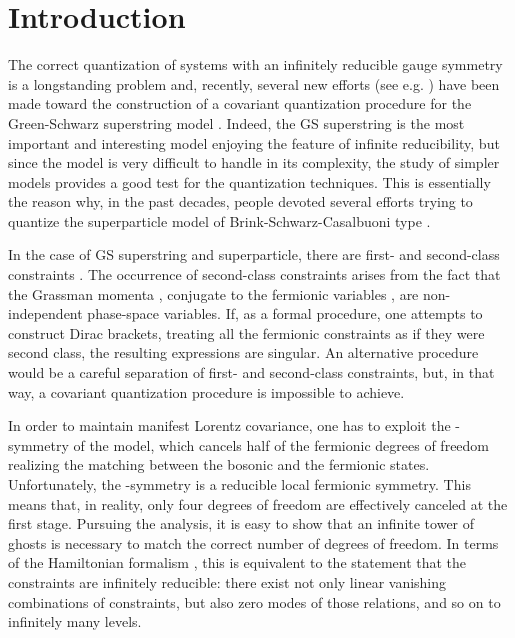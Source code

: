 \documentclass[a4paper,12pt]{article}
\renewcommand{\theequation}{\thesection.\arabic{equation}}
\begin{document}
\def\SL#1{\rlap{\hbox{\myHighlight{$\mskip 4.5 mu /$}\coordHE{}}}#1}     %
\renewcommand {\theequation}{\arabic{section}.\arabic{equation}}


\section{Introduction}
\label{sec:intro}


The correct quantization of systems with an infinitely reducible gauge
symmetry is a longstanding problem and, recently, several new efforts
(see e.g. \cite{berko}) have been made toward the construction of a
covariant quantization procedure for the Green-Schwarz superstring
model \cite{green3}. Indeed, the GS superstring is the most important
and interesting model enjoying the feature of infinite reducibility,
but since the model is very difficult to handle in its complexity, the
study of simpler models provides a good test for the quantization
techniques. This is essentially the reason why, in the past decades,
people devoted several efforts trying to quantize the superparticle
model of Brink-Schwarz-Casalbuoni type \cite{Brink-Schwarz}.

In the case of GS superstring and superparticle, there are first- and
second-class constraints \cite{Dirac,henneaux,gitman,bht}.  The occurrence
of second-class constraints arises from the fact that the Grassman
momenta \coordHE{}, conjugate to the fermionic variables
\myHighlight{$\theta_\alpha$}\coordHE{}, are non-independent phase-space variables.  If, as a
formal procedure, one attempts to construct Dirac brackets, treating
all the fermionic constraints as if they were second class, the
resulting expressions are singular. An alternative procedure would be
a careful separation of first- and second-class constraints, but, in
that way, a covariant quantization procedure is impossible to achieve.

In order to maintain manifest Lorentz covariance, one has to exploit
the \myHighlight{$\kappa$}\coordHE{}-symmetry \cite{green3,Siegel:1983hh} of the model, which
cancels half of the fermionic degrees of freedom realizing the
matching between the bosonic and the fermionic states.  Unfortunately,
the \myHighlight{$\kappa$}\coordHE{}-symmetry is a reducible local fermionic symmetry. This
means that, in reality, only four degrees of freedom are effectively
canceled at the first stage. Pursuing the analysis, it is easy to show
that an infinite tower of ghosts is necessary to match the correct
number of degrees of freedom.
%
In terms of the Hamiltonian formalism \cite{gitman}, this is
equivalent to the statement that the constraints are infinitely
reducible: there exist not only linear vanishing combinations of
constraints, but also zero modes of those relations, and so on to
infinitely many levels.
\end{document}
